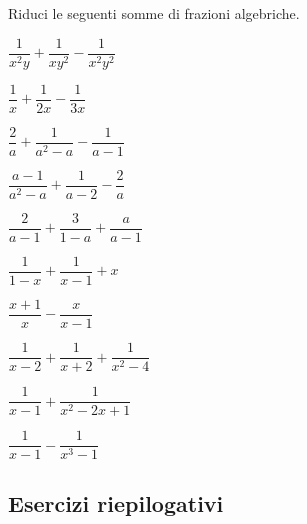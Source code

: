 \begin{esercizio}[*]
\label{ese:19.28}
Riduci le seguenti somme di frazioni algebriche.
\begin{htmulticols}{2}
\begin{enumeratea}
\item \(\dfrac{1}{x^{2}y}+\dfrac{1}{xy^{2}}-\dfrac{1}{x^{2}y^{2}}\)
\item \(\dfrac{1}{x}+\dfrac{1}{2x}-\dfrac{1}{3x}\)
\item \(\dfrac{2}{a}+\dfrac{1}{a^{{2}}-a}-\dfrac{1}{a-1}\)
\item \(\dfrac{a-1}{a^{2}-a}+\dfrac{1}{a-2}-\dfrac{2}{a}\)
\item \(\dfrac{2}{a-1}+\dfrac{3}{1-a}+\dfrac{a}{a-1}\)
\item \(\dfrac{1}{1-x}+\dfrac{1}{x-1}+x\)
\item \(\dfrac{x+1}{x}-\dfrac{x}{x-1}\)
\item \(\dfrac{1}{x-2}+\dfrac{1}{x+2}+\dfrac{1}{x^{{2}}-4}\)
\item \(\dfrac{1}{x-1}+\dfrac{1}{x^{2}-2x+1}\)
\item \(\dfrac{1}{x-1}-\dfrac{1}{x^{3}-1}\)
\end{enumeratea}
\end{htmulticols}
\end{esercizio}


\subsection*{Esercizi riepilogativi}

